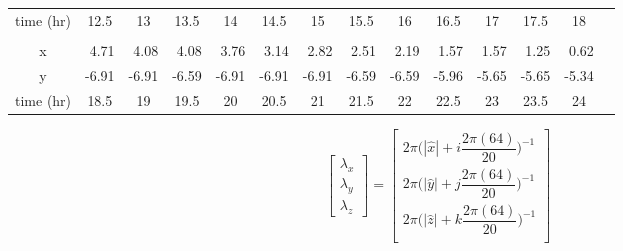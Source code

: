 \documentclass{article}
\begin{document}
\begin{table}[!b]
\begin{tabular}{crrrrrrrrrrrrl}
		\multicolumn{1}{|c|}{time (hr)} & \multicolumn{1}{c|}{12.5}  & \multicolumn{1}{c|}{13}    & \multicolumn{1}{c|}{13.5}  & \multicolumn{1}{c|}{14}    & \multicolumn{1}{c|}{14.5}  & \multicolumn{1}{c|}{15}    & \multicolumn{1}{c|}{15.5}  & \multicolumn{1}{c|}{16}    & \multicolumn{1}{c|}{16.5}  & \multicolumn{1}{c|}{17}    & \multicolumn{1}{c|}{17.5}  & \multicolumn{1}{c|}{18}    & \multicolumn{1}{c}{}      \\ \cline{1-13}
		\multicolumn{1}{l}{}            & \multicolumn{1}{l}{}       & \multicolumn{1}{l}{}       & \multicolumn{1}{l}{}       & \multicolumn{1}{l}{}       & \multicolumn{1}{l}{}       & \multicolumn{1}{l}{}       & \multicolumn{1}{l}{}       & \multicolumn{1}{l}{}       & \multicolumn{1}{l}{}       & \multicolumn{1}{l}{}       & \multicolumn{1}{l}{}       & \multicolumn{1}{l}{}       &                           \\ \cline{1-13}
		\multicolumn{1}{|c|}{x}         & \multicolumn{1}{r|}{4.71}  & \multicolumn{1}{r|}{4.08}  & \multicolumn{1}{r|}{4.08}  & \multicolumn{1}{r|}{3.76}  & \multicolumn{1}{r|}{3.14}  & \multicolumn{1}{r|}{2.82}  & \multicolumn{1}{r|}{2.51}  & \multicolumn{1}{r|}{2.19}  & \multicolumn{1}{r|}{1.57}  & \multicolumn{1}{r|}{1.57}  & \multicolumn{1}{r|}{1.25}  & \multicolumn{1}{r|}{0.62}  &                           \\ \cline{1-13}
		\multicolumn{1}{|c|}{y}         & \multicolumn{1}{r|}{-6.91} & \multicolumn{1}{r|}{-6.91} & \multicolumn{1}{r|}{-6.59} & \multicolumn{1}{r|}{-6.91} & \multicolumn{1}{r|}{-6.91} & \multicolumn{1}{r|}{-6.91} & \multicolumn{1}{r|}{-6.59} & \multicolumn{1}{r|}{-6.59} & \multicolumn{1}{r|}{-5.96} & \multicolumn{1}{r|}{-5.65} & \multicolumn{1}{r|}{-5.65} & \multicolumn{1}{r|}{-5.34} &                           \\ \cline{1-13}
		\multicolumn{1}{|c|}{time (hr)} & \multicolumn{1}{c|}{18.5}  & \multicolumn{1}{c|}{19}    & \multicolumn{1}{c|}{19.5}  & \multicolumn{1}{c|}{20}    & \multicolumn{1}{c|}{20.5}  & \multicolumn{1}{c|}{21}    & \multicolumn{1}{c|}{21.5}  & \multicolumn{1}{c|}{22}    & \multicolumn{1}{c|}{22.5}  & \multicolumn{1}{c|}{23}    & \multicolumn{1}{c|}{23.5}  & \multicolumn{1}{c|}{24}    &                           \\ \cline{1-13}
	\end{tabular}
	\label{tab:aerial}
\end{table}


\begin{equation}
\begin{bmatrix}
	\lambda_x\\
	\lambda_y\\
	\lambda_z
\end{bmatrix} = \begin{bmatrix}
2\pi\big(|\hat{x}|+i\dfrac{2\pi(64)}{20}\big)^{-1} \\
2\pi\big(|\hat{y}|+j\dfrac{2\pi(64)}{20}\big)^{-1} \\
2\pi\big(|\hat{z}|+k\dfrac{2\pi(64)}{20}\big)^{-1} \\
\end{bmatrix}
\label{eqn:general_wavelength}
\end{equation}
\end{document}
